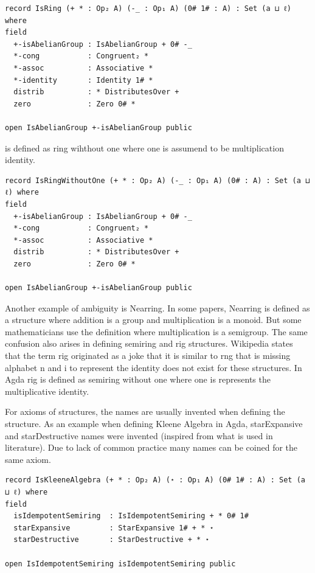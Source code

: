 \begin{verbatim}
record IsRing (+ * : Op₂ A) (-_ : Op₁ A) (0# 1# : A) : Set (a ⊔ ℓ) where
field
  +-isAbelianGroup : IsAbelianGroup + 0# -_
  *-cong           : Congruent₂ *
  *-assoc          : Associative *
  *-identity       : Identity 1# *
  distrib          : * DistributesOver +
  zero             : Zero 0# *

open IsAbelianGroup +-isAbelianGroup public
\end{verbatim} 
 is defined as ring wihthout one where one is assumend to be multiplication identity.\\
\begin{verbatim}
record IsRingWithoutOne (+ * : Op₂ A) (-_ : Op₁ A) (0# : A) : Set (a ⊔ ℓ) where
field
  +-isAbelianGroup : IsAbelianGroup + 0# -_
  *-cong           : Congruent₂ *
  *-assoc          : Associative *
  distrib          : * DistributesOver +
  zero             : Zero 0# *

open IsAbelianGroup +-isAbelianGroup public
\end{verbatim}

Another example of ambiguity is Nearring. In some papers, Nearring is defined as
a structure where addition is a group and multiplication is a monoid. But some
mathematicians use the definition where multiplication is a semigroup. The same
confusion also arises in defining semiring and rig structures. Wikipedia states
that the term rig originated as a joke that it is similar to rng that is missing
alphabet n and i to represent the identity does not exist for these structures.
In Agda rig is defined as semiring without one where one is represents the
multiplicative identity.

For axioms of structures, the names are usually invented when defining the
structure. As an example when defining Kleene Algebra in Agda, starExpansive and
starDestructive names were invented (inspired from what is used in literature).
Due to lack of common practice many names can be coined for the same axiom.

\begin{verbatim}
record IsKleeneAlgebra (+ * : Op₂ A) (⋆ : Op₁ A) (0# 1# : A) : Set (a ⊔ ℓ) where
field
  isIdempotentSemiring  : IsIdempotentSemiring + * 0# 1#
  starExpansive         : StarExpansive 1# + * ⋆
  starDestructive       : StarDestructive + * ⋆

open IsIdempotentSemiring isIdempotentSemiring public
\end{verbatim} 

